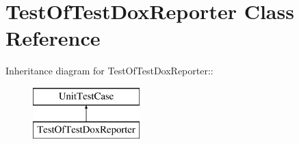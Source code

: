 \hypertarget{class_test_of_test_dox_reporter}{
\section{TestOfTestDoxReporter Class Reference}
\label{class_test_of_test_dox_reporter}
}
Inheritance diagram for TestOfTestDoxReporter::\begin{figure}[H]
\begin{center}
\leavevmode
\includegraphics[height=2cm]{class_test_of_test_dox_reporter}
\end{center}
\end{figure}
